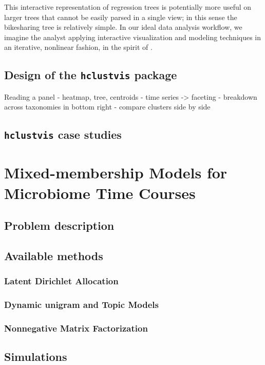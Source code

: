 \documentclass{report}
\begin{document}
This interactive representation of regression trees is potentially more
useful on larger trees that cannot be easily parsed in a single view; in
this sense the bikesharing tree is relatively simple. In our ideal data
analysis workflow, we imagine the analyst applying interactive
visualization and modeling techniques in an iterative, nonlinear
fashion, in the spirit of \citep{de2003visual}.

\section{Design of the \texttt{hclustvis} package}

Reading a panel
- heatmap, tree, centroids
- time series -> faceting
- breakdown across taxonomies in bottom right
- compare clusters side by side

\section{\texttt{hclustvis} case studies}

\chapter{Mixed-membership Models for Microbiome Time Courses}

\section{Problem description}

\section{Available methods}

\subsection{Latent Dirichlet Allocation}

\subsection{Dynamic unigram and Topic Models}

\subsection{Nonnegative Matrix Factorization}

\section{Simulations}
\end{document}
